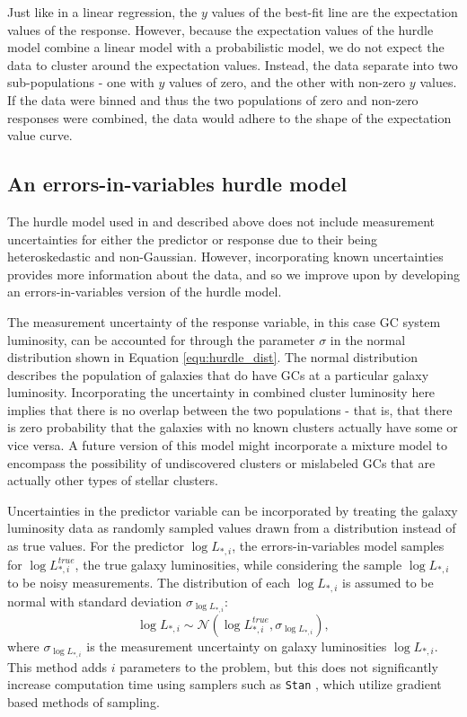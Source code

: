 \documentclass[twocolumn]{aastex631}
\begin{document}
Just like in a linear regression, the $y$ values of the best-fit line are the expectation values of the response. However, because the expectation values of the hurdle model combine a linear model with a probabilistic model, we do not expect the data to cluster around the expectation values. Instead, the data separate into two sub-populations - one with $y$ values of zero, and the other with non-zero $y$ values. If the data were binned and thus the two populations of zero and non-zero responses were combined, the data would adhere to the shape of the expectation value curve. 

\subsection{An errors-in-variables hurdle model} \label{subsec:eiv}

The hurdle model used in  and described above does not include measurement uncertainties for either the predictor or response due to their being heteroskedastic and non-Gaussian. However, incorporating known uncertainties provides more information about the data, and so we improve upon  by developing an errors-in-variables version of the hurdle model. 

The measurement uncertainty of the response variable, in this case GC system luminosity, can be accounted for through the parameter $\sigma$ in the normal distribution shown in Equation \ref{equ:hurdle_dist}. The normal distribution describes the population of galaxies that do have GCs at a particular galaxy luminosity. Incorporating the uncertainty in combined cluster luminosity here implies that there is no overlap between the two populations  - that is, that there is zero probability that the galaxies with no known clusters actually have some or vice versa. A future version of this model might incorporate a mixture model to encompass the possibility of undiscovered clusters or mislabeled GCs that are actually other types of stellar clusters. 

Uncertainties in the predictor variable can be incorporated by treating the galaxy luminosity data as randomly sampled values drawn from a distribution instead of as true values. For the predictor $\log{L_{*,i}}$, the errors-in-variables model samples for $\log{L_{*,i}^{true}}$, the true galaxy luminosities, while considering the sample $\log{L_{*,i}}$ to be noisy measurements. The distribution of each $\log{L_{*,i}}$ is assumed to be normal with standard deviation $\sigma_{\log{L_{*,i}}}$:
\begin{equation}
    \log{L_{*,i}} \sim \mathcal{N}(\log{L_{*,i}^{true}},\sigma_{\log{L_{*,i}}}),
\end{equation} 
where $\sigma_{\log{L_{*,i}}}$ is the measurement uncertainty on galaxy luminosities $\log{L_{*,i}}$. This method adds $i$ parameters to the problem, but this does not significantly increase computation time using samplers such as \texttt{Stan} \citep{stan}, which utilize gradient based methods of sampling. 
\end{document}
